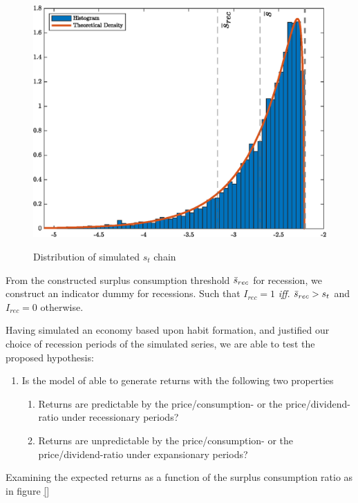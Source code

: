 \begin{figure}[H]
    \centering
    \caption{Distribution of simulated $s_t$ chain}
    \includegraphics[width=\textwidth]{Figures/DistributionS_t.eps}
    \label{fig:DistriSt}
\end{figure}
From the constructed surplus consumption threshold $\Bar{s}_{rec}$ for recession, we construct an indicator dummy for recessions. Such that $I_{rec} = 1$ \textit{iff}. $\Bar{s}_{rec} > s_t$ and $I_{rec}=0$ otherwise.

Having simulated an economy based upon habit formation, and justified our choice of recession periods of the simulated series, we are able to test the proposed hypothesis:
\begin{enumerate}
    \item Is the model of \citet{Campbell1999} able to generate returns with the following two properties
    \begin{enumerate}
        \item Returns are predictable by the price/consumption- or the price/dividend-ratio under recessionary periods?
        \item Returns are unpredictable by the price/consumption- or the price/dividend-ratio under expansionary periods?
    \end{enumerate}
\end{enumerate}
Examining the expected returns as a function of the surplus consumption ratio as in figure \ref{}

